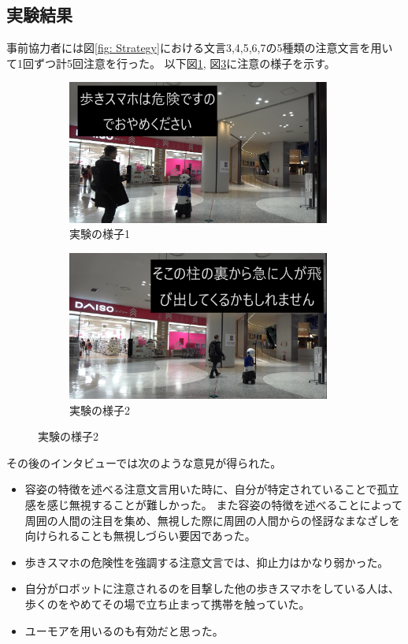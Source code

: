 \documentclass{kuisthesis}
\begin{document}
\subsection{実験結果}
事前協力者には図\ref{fig: Strategy}における文言3,4,5,6,7の5種類の注意文言を用いて1回ずつ計5回注意を行った。
以下図\ref{fig: Experimentjani}, 図\ref{fig: Experimentjani2}に注意の様子を示す。
\begin{figure}[h]
  \begin{subfigure}{0.5\textwidth}
    \centering
    \includegraphics[width=0.95\textwidth]{img/jani2.png}
    \caption{実験の様子1}
    \label{fig: Experimentjani}
  \end{subfigure}
  \begin{subfigure}{0.5\textwidth}
    \centering
    \includegraphics[width=0.95\textwidth]{img/jani3.png}
    \caption{実験の様子2}
    \label{fig: Experimentjani2}
  \end{subfigure}
\end{figure}
その後のインタビューでは次のような意見が得られた。
\begin{itemize}
  \item 容姿の特徴を述べる注意文言用いた時に、自分が特定されていることで孤立感を感じ無視することが難しかった。
        また容姿の特徴を述べることによって周囲の人間の注目を集め、無視した際に周囲の人間からの怪訝なまなざしを向けられることも無視しづらい要因であった。
  \item 歩きスマホの危険性を強調する注意文言では、抑止力はかなり弱かった。
  \item 自分がロボットに注意されるのを目撃した他の歩きスマホをしている人は、歩くのをやめてその場で立ち止まって携帯を触っていた。
  \item ユーモアを用いるのも有効だと思った。
\end{itemize}
\end{document}

